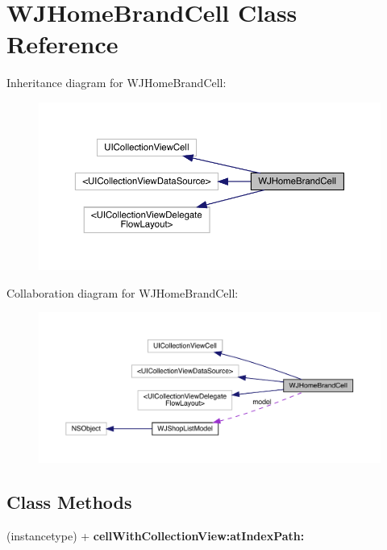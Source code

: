 \hypertarget{interface_w_j_home_brand_cell}{}\section{W\+J\+Home\+Brand\+Cell Class Reference}
\label{interface_w_j_home_brand_cell}


Inheritance diagram for W\+J\+Home\+Brand\+Cell\+:\nopagebreak
\begin{figure}[H]
\begin{center}
\leavevmode
\includegraphics[width=350pt]{interface_w_j_home_brand_cell__inherit__graph}
\end{center}
\end{figure}


Collaboration diagram for W\+J\+Home\+Brand\+Cell\+:\nopagebreak
\begin{figure}[H]
\begin{center}
\leavevmode
\includegraphics[width=350pt]{interface_w_j_home_brand_cell__coll__graph}
\end{center}
\end{figure}
\subsection*{Class Methods}
\begin{DoxyCompactItemize}
\item 
\mbox{\label{interface_w_j_home_brand_cell_ac03caa7f751edbe8ab03d2572eee2d10}} 
(instancetype) + {\bfseries cell\+With\+Collection\+View\+:at\+Index\+Path\+:}
\end{DoxyCompactItemize}

